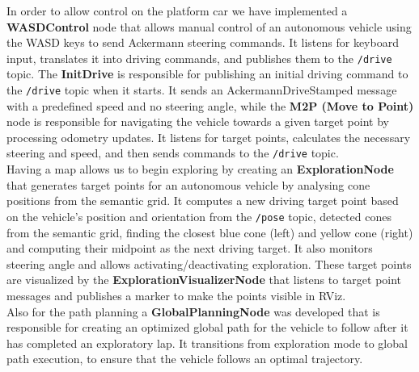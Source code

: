 In order to allow control on the platform car we have implemented a \textbf{WASDControl} node that allows manual control of an autonomous vehicle using the WASD keys to send Ackermann steering commands. It listens for keyboard input, translates it into driving commands, and publishes them to the \texttt{/drive} topic.
The \textbf{InitDrive} is responsible for publishing an initial driving command to the \texttt{/drive} topic when it starts. It sends an AckermannDriveStamped message with a predefined speed and no steering angle, while the \textbf{M2P (Move to Point)} node is responsible for navigating the vehicle towards a given target point by processing odometry updates. It listens for target points, calculates the necessary steering and speed, and then sends commands to the \texttt{/drive} topic.\\
\newline
Having a map allows us to begin exploring by creating an \textbf{ExplorationNode} that generates target points for an autonomous vehicle by analysing cone positions from the semantic grid. It computes a new driving target point based on the vehicle's position and orientation from the \texttt{/pose} topic, detected cones from the semantic grid, finding the closest blue cone (left) and yellow cone (right) and computing their midpoint as the next driving target. It also monitors steering angle and allows activating/deactivating exploration.
These target points are visualized by the \textbf{ExplorationVisualizerNode} that listens to target point messages and publishes a marker to make the points visible in RViz.\\
\newline
Also for the path planning a \textbf{GlobalPlanningNode} was developed that is responsible for creating an optimized global path for the vehicle to follow after it has completed an exploratory lap. It transitions from exploration mode to global path execution, to ensure that the vehicle follows an optimal trajectory.
